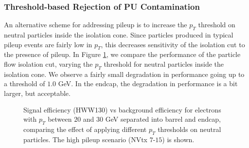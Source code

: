 \subsubsection{Threshold-based Rejection of PU Contamination}
\label{sec:ThresholdBasedIsolation}
An alternative scheme for addressing pileup is to increase the $p_{T}$ threshold on neutral 
particles inside the isolation cone. Since particles produced in typical pileup events are
fairly low in $p_{T}$, this decreases sensitivity of the isolation cut to the presence of 
pileup. In Figure \ref{fig:IsoPerformance_Ele_PtThresholds}, we compare the performance
of the particle flow isolation cut, varying the $p_{T}$ threshold for neutral particles
inside the isolation cone. We observe a fairly small degradation in performance going up
to a threshold of $1.0$ GeV. In the endcap, the degradation in performance is a bit
larger, but acceptable. 

\begin{figure}[!htbp]
\begin{center}
\caption{Signal efficiency (HWW130) vs background efficiency for electrons with $p_{T}$ between $20$ and $30$ GeV
separated into barrel and endcap, comparing the effect of applying different $p_{T}$ thresholds on neutral particles.
The high pileup scenario (NVtx $7$-$15$) is shown.}
\label{fig:IsoPerformance_Ele_PtThresholds}
\end{center}
\end{figure}



